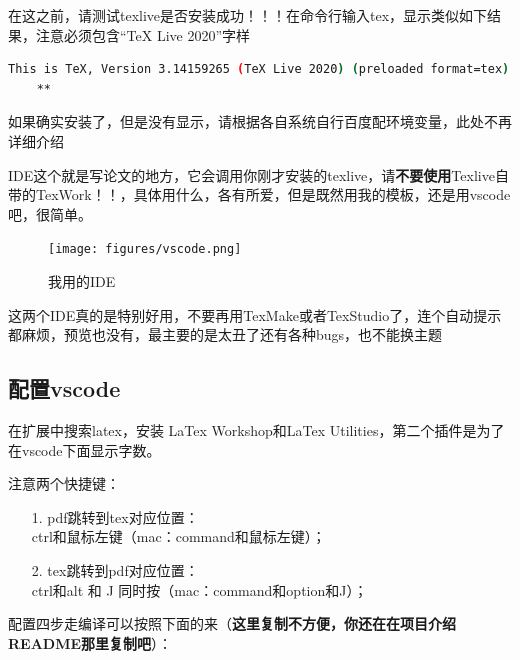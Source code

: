 \documentclass[AutoFakeBold]{LZUThesis2007}
\begin{document}
在这之前，请测试texlive是否安装成功！！！在命令行输入tex，显示类似如下结果，注意必须包含“TeX Live 2020”字样

\begin{lstlisting}[language=bash]
    This is TeX, Version 3.14159265 (TeX Live 2020) (preloaded format=tex)
    **
\end{lstlisting}


如果确实安装了，但是没有显示，请根据各自系统自行百度配环境变量，此处不再详细介绍


IDE这个就是写论文的地方，它会调用你刚才安装的texlive，请\textbf{不要使用}Texlive自带的TexWork！！，具体用什么，各有所爱，但是既然用我的模板，还是用vscode吧，很简单。


\begin{figure}[H]
	\centering
    \texttt{[image: figures/vscode.png]}
    \caption{我用的IDE}
    \label{fig_ide}
\end{figure}

这两个IDE真的是特别好用，不要再用TexMake或者TexStudio了，连个自动提示都麻烦，预览也没有，最主要的是太丑了还有各种bugs，也不能换主题


\subsection{配置vscode}
在扩展中搜索latex，安装 LaTex Workshop和LaTex Utilities，第二个插件是为了在vscode下面显示字数。

注意两个快捷键：
\begin{itemize}
	\item[1. ] pdf跳转到tex对应位置：\\ctrl和鼠标左键（mac：command和鼠标左键）；
	\item[2. ] tex跳转到pdf对应位置：\\ctrl和alt 和 J 同时按（mac：command和option和J）；
\end{itemize}

配置四步走编译可以按照下面的来（\textbf{这里复制不方便，你还在在项目介绍README那里复制吧}）：
\end{document}

